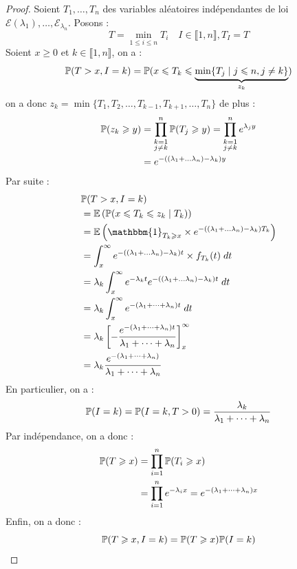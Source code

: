 \begin{proof}
    Soient $T_1, \dots, T_n$ des variables aléatoires indépendantes de loi $ \mathcal{E}( \lambda_1), \dots, \mathcal{E}_{ \lambda_n}$. 
    Posons : 
        $$ T = \min_{1 \leqslant i \leqslant n} T_i \quad I \in \llbracket 1, n \rrbracket, T_I = T $$ 
    Soient $x \geqslant 0$ et $ k \in \llbracket 1, n \rrbracket $, on a :
        $$ \mathbb{P}(T > x, I = k) = \mathbb{P}(x \leqslant T_k \leqslant \underbrace{\min \{T_j \mid j \leqslant n, j \not = k \}}_{z_k}) $$ 
    on a donc $z_k = \min \{T_1, T_2, \dots, T_{k-1}, T_{k+1}, \dots, T_n\}$ de plus : 
        \begin{align*}
            \mathbb{P}(z_k \geqslant y) &= \prod_{\substack{k = 1 \\j \not = k}}^{n} \mathbb{P}(T_j \geqslant y)
            = \prod_{\substack{k = 1 \\j \not = k}}^{n} e^{ \lambda_j y } \\ 
            &= e^{- (( \lambda_1 + \dots \lambda_n) - \lambda_k)y }
        \end{align*}
    Par suite : 
        \begin{align*}
            & \myP(T > x, I = k) \\  
            &= \mathbb{E} \left( \myP(x \leqslant T_k \leqslant z_k \mid T_k) \right) \\ 
            &= \mathbb{E} \left( \mathbbm{1}_{T_k \geqslant x} \times e^{- (( \lambda_1 + \dots \lambda_n) - \lambda_k) T_k} \right) \\ 
            &= \int_{x}^{\infty} e^{- (( \lambda_1 + \dots \lambda_n) - \lambda_k)t} \times f_{T_k}(t) \; dt \\
            &= \lambda_k \int_{x}^{\infty} e^{ - \lambda_k t} e^{- (( \lambda_1 + \dots \lambda_n) - \lambda_k)t} \; dt \\
            &= \lambda_k \int_{x}^{\infty} e^{- ( \lambda_1 + \dots + \lambda_n) t} \; dt \\ 
            &= \lambda_k \left[ - \frac{e^{- ( \lambda_1 + \dots + \lambda_n) t}}{ \lambda_1 + \dots + \lambda_n} \right]_x^{\infty} \\ 
            &= \lambda_k \frac{e^{- ( \lambda_1 + \dots + \lambda_n) }}{ \lambda_1 + \dots + \lambda_n} 
        \end{align*}
    En particulier, on a : 
        $$ \mathbb{P}(I = k) = \mathbb{P}(I = k, T > 0) = \frac{ \lambda_k}{ \lambda_1 + \dots + \lambda_n} $$ 
    Par indépendance, on a donc : 
        \begin{align*}
            \mathbb{P}(T \geqslant x) &= \prod_{i=1}^{n} \mathbb{P}(T_i \geqslant x) \\ 
            &= \prod_{i=1}^{n} e^{- \lambda_i x} = e^{ -( \lambda_1 + \dots + \lambda_n) x}   
        \end{align*}
    Enfin, on a donc : 
        $$ \mathbb{P}(T \geqslant x, I = k) = \mathbb{P}(T \geqslant x) \mathbb{P}(I = k) $$   
\end{proof}


